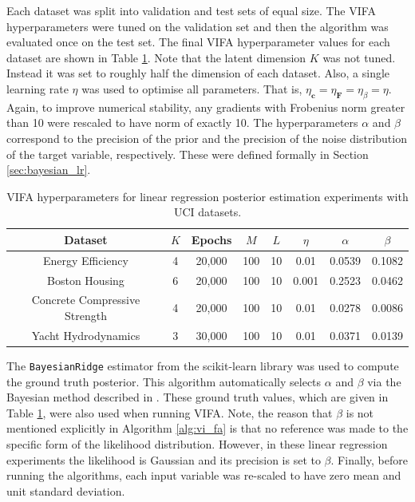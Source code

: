 \documentclass[msc,deptreport.inf]{infthesis} %
\newcommand{\matr}[1]{\mathbf{#1}}
\begin{document}
Each dataset was split into validation and test sets of equal size. The VIFA hyperparameters were tuned on the validation set and then the algorithm was evaluated once on the test set. The final VIFA hyperparameter values for each dataset are shown in Table \ref{table:vifa_uci_hyperparameters}. Note that the latent dimension $K$ was not tuned. Instead it was set to roughly half the dimension of each dataset. Also, a single learning rate $\eta$ was used to optimise all parameters. That is, $\eta_\matr{c} = \eta_\matr{F} = \eta_\beta = \eta$. Again, to improve numerical stability, any gradients with Frobenius norm greater than 10 were rescaled to have norm of exactly 10. The hyperparameters $\alpha$ and $\beta$ correspond to the precision of the prior and the precision of the noise distribution of the target variable, respectively. These were defined formally in Section \ref{sec:bayesian_lr}.

\begin{table}[h!]
	\begin{center}
		\begin{tabular}{||c c c c c c c c||} 
			\hline
 			Dataset & $K$ & Epochs & $M$ & $L$ & $\eta$ & $\alpha$ & $\beta$ \\ [0.5ex] 
			\hline\hline
			Energy Efficiency 				& 4 & 20,000 & 100 & 10 	& 0.01 	& 0.0539 & 0.1082 \\ 
 			\hline
			Boston Housing 				& 6 & 20,000 & 100 & 10 	& 0.001 	& 0.2523 & 0.0462 \\
 			\hline
 			Concrete Compressive Strength	& 4 & 20,000 & 100 & 10 	& 0.01 	& 0.0278 & 0.0086 \\
 			\hline
 			Yacht Hydrodynamics 			& 3 & 30,000 & 100 & 10 	& 0.01 	& 0.0371 & 0.0139 \\ [1ex] 
 			\hline
		\end{tabular}
		\caption{VIFA hyperparameters for linear regression posterior estimation experiments with UCI datasets.}
		\label{table:vifa_uci_hyperparameters}
	\end{center}
\end{table}

The \texttt{BayesianRidge} estimator from the scikit-learn library \cite{pedregosa2012} was used to compute the ground truth posterior. This algorithm automatically selects $\alpha$ and $\beta$ via the Bayesian method described in \cite{mackay1992}. These ground truth values, which are given in Table \ref{table:vifa_uci_hyperparameters}, were also used when running VIFA. Note, the reason that $\beta$ is not mentioned explicitly in Algorithm \ref{alg:vi_fa} is that no reference was made to the specific form of the likelihood distribution. However, in these linear regression experiments the likelihood is Gaussian and its precision is set to $\beta$. Finally, before running the algorithms, each input variable was re-scaled to have zero mean and unit standard deviation.  
\end{document}

